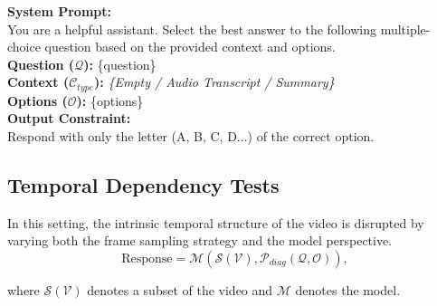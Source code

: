         \begin{table}[h!] \centering \begin{tcolorbox}[colback=gray!5, colframe=gray!50, arc=2mm, boxrule=0.5pt, left=2mm, right=2mm, top=2mm, bottom=2mm] \footnotesize \textbf{System Prompt:} \\ You are a helpful assistant. Select the best answer to the following multiple-choice question based on the provided context and options. \\ \textbf{Question ($\mathcal{Q}$):} \{question\} \\ \textbf{Context ($\mathcal{C}_{type}$):} \textit{\{Empty / Audio Transcript / Summary\}} \\ \textbf{Options ($\mathcal{O}$):} \{options\} \\ \textbf{Output Constraint:} \\ Respond with only the letter (A, B, C, D...) of the correct option. \end{tcolorbox} \caption{Prompt template for visual dependency tests with different contexts.} \label{tab:prompt} \vspace{-8mm} \end{table}
        
    \subsection{Temporal Dependency Tests}
    
        In this setting, the intrinsic temporal structure of the video is disrupted by varying both the frame sampling strategy and the model perspective.
        \begin{equation}
            \text{Response} = \mathcal{M}\left( \mathcal{S}(\mathcal{V}), \mathcal{P}_{diag}(\mathcal{Q}, \mathcal{O}) \right),
        \end{equation}
        
        \noindent where $\mathcal{S}(\mathcal{V})$ denotes a subset of the video and $\mathcal{M}$ denotes the model.
    
